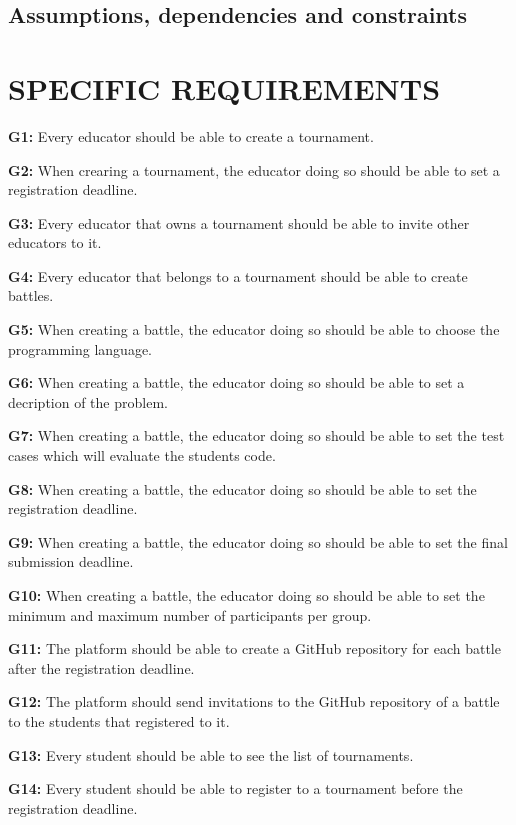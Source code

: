 \documentclass{article}
\begin{document}
\subsection{Assumptions, dependencies and constraints}

\section{SPECIFIC REQUIREMENTS}
\iffalse
    \item \textbf{G1:} Every educator should be able to create a tournament.
    \item \textbf{G2:} When crearing a tournament, the educator doing so should be able to set a registration deadline.
    \item \textbf{G3:} Every educator that owns a tournament should be able to invite other educators to it.
    \item \textbf{G4:} Every educator that belongs to a tournament should be able to create battles.
    \item \textbf{G5:} When creating a battle, the educator doing so should be able to choose the programming language.
    \item \textbf{G6:} When creating a battle, the educator doing so should be able to set a decription of the problem.
    \item \textbf{G7:} When creating a battle, the educator doing so should be able to set the test cases which will evaluate the students code.
    \item \textbf{G8:} When creating a battle, the educator doing so should be able to set the registration deadline.
    \item \textbf{G9:} When creating a battle, the educator doing so should be able to set the final submission deadline.
    \item \textbf{G10:} When creating a battle, the educator doing so should be able to set the minimum and maximum number of participants per group.
    \item \textbf{G11:} The platform should be able to create a GitHub repository for each battle after the registration deadline.
    \item \textbf{G12:} The platform should send invitations to the GitHub repository of a battle to the students that registered to it.
    \item \textbf{G13:} Every student should be able to see the list of tournaments.
    \item \textbf{G14:} Every student should be able to register to a tournament before the registration deadline.
\end{document}
